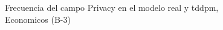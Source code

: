 \begin{figure}[H]
    \centering
    
    \caption{Frecuencia del campo Privacy en el modelo real y tddpm, Economicos (B-3)}
    \label{frecuency-Privacy-tddpm_mlp}
\end{figure}